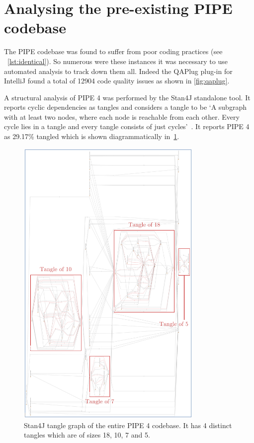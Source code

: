  \section{Analysing the pre-existing PIPE codebase}
The PIPE codebase was found to suffer from poor coding practices (see ~\cref{lst:identical}). So numerous were these instances it was necessary to use automated analysis to track down them all. Indeed the QAPlug plug-in for IntelliJ found a total of \num{12904} code quality issues as shown in \cref{fig:qaplug}.

A structural analysis of PIPE 4 was performed by the Stan4J standalone tool. It reports cyclic dependencies as tangles and considers a tangle to be `A subgraph with at least two nodes, where each node is reachable from each other. Every cycle lies in a tangle and every tangle consists of just cycles'~\cite{stan_whitepaper}. It reports PIPE 4 as 29.17\% tangled which is shown diagrammatically in~\cref{fig:tangle}.

\begin{figure}[tb]
\begin{center}
    \includegraphics[width=0.8\textwidth]{analysis/tangle_annotated.png} 
    \caption{Stan4J tangle graph of the entire PIPE 4 codebase. It has 4 distinct tangles which are of sizes 18, 10, 7 and 5.}
    \label{fig:tangle}
\end{center}
\end{figure}

